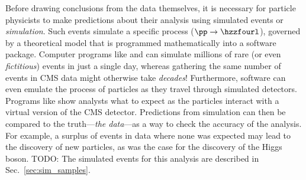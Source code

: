 
Before drawing conclusions from the data themselves, it is necessary for particle physicists to make predictions about their analysis using simulated events or \emph{simulation}.
Such events simulate a specific process (\eg $\pp \to \hzzfourl$), governed by a theoretical model that is programmed mathematically into a software package.
Computer programs like \MGvATNLO and \POWHEG can simulate millions of rare (or even \emph{fictitious}) events in just a single day, whereas gathering the same number of events in CMS data might otherwise take \emph{decades}!
Furthermore, software can even emulate the process of particles as they travel through simulated detectors.
Programs like \GEANTfour show analysts what to expect as the particles interact with a virtual version of the CMS detector.
Predictions from simulation can then be compared to the truth---\emph{the data}---as a way to check the accuracy of the analysis.
For example, a surplus of events in data where none was expected may lead to the discovery of new particles, as was the case for the discovery of the Higgs boson.
TODO: The simulated events for this analysis are described in Sec.~\ref{sec:sim_samples}.


